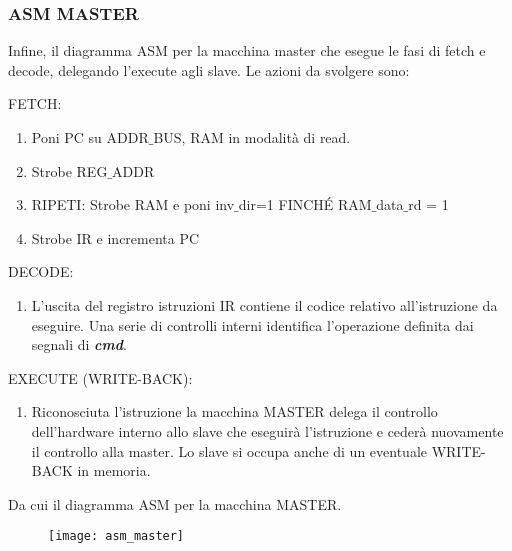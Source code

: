 \newpage
\subsubsection{ASM MASTER}
Infine, il diagramma ASM per la macchina master che esegue le fasi di fetch e decode, delegando l'execute agli slave. Le azioni da svolgere sono:\\
\par \bigskip \noindent
FETCH:
\begin{enumerate}
	\item Poni PC su ADDR$\_$BUS, RAM in modalità di read.
	\item Strobe REG$\_$ADDR
	\item RIPETI: Strobe RAM e poni inv$\_$dir=1 FINCHÉ RAM$\_$data$\_$rd = 1
	\item Strobe IR e incrementa PC
\end{enumerate}

\par \bigskip \noindent
DECODE:
\begin{enumerate}
	\item L'uscita del registro istruzioni IR contiene il codice relativo all'istruzione da eseguire. Una serie di controlli interni identifica l'operazione definita dai segnali di \textbf{\textit{cmd}}.
\end{enumerate}

\par \bigskip \noindent
EXECUTE (WRITE-BACK):
\begin{enumerate}
	\item Riconosciuta l'istruzione la macchina MASTER delega il controllo dell'hardware interno allo slave che eseguirà l'istruzione e cederà nuovamente il controllo alla master. Lo slave si occupa anche di un eventuale WRITE-BACK in memoria.
\end{enumerate}

\noindent
Da cui il diagramma ASM per la macchina MASTER.
\begin{figure}[H]
	\centering
	\texttt{[image: asm\_master]}
	\label{fig:asm_master}
\end{figure}

